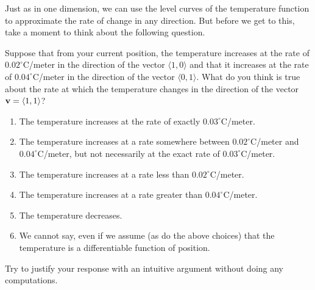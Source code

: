 \documentclass{ximera}
\begin{document}
Just as in one dimension, we can use the level curves of the temperature function to approximate the rate of change in any direction. But before we get to this, take a moment to think about the following question.

\begin{question}  \label{Qwerder432}
Suppose that from your current position, the temperature increases at the rate of $0.02^\circ$C/meter in the direction of the vector $\langle 1, 0 \rangle$ and that it increases at the rate of $0.04^\circ$C/meter in the direction of the vector $\langle 0,1\rangle$. What do you think is true about the rate at which the temperature changes in the direction of the vector ${\bf v} = \langle 1,1\rangle$?

\begin{enumerate}

\item The temperature increases at the rate of exactly $0.03^\circ$C/meter.

\item The temperature increases at a rate somewhere between $0.02^\circ$C/meter and $0.04^\circ$C/meter, but not necessarily at the exact rate of $0.03^\circ$C/meter.

\item The temperature increases at a rate less than $0.02^\circ$C/meter.

\item The temperature increases at a rate greater than $0.04^\circ$C/meter.

\item The temperature decreases.

\item We cannot say, even if we assume (as do the above choices) that the temperature is a differentiable function of position.

\end{enumerate}

Try to justify your response with an intuitive argument without doing any computations.
\begin{freeResponse}
\end{freeResponse}

\end{question}
\end{document}
